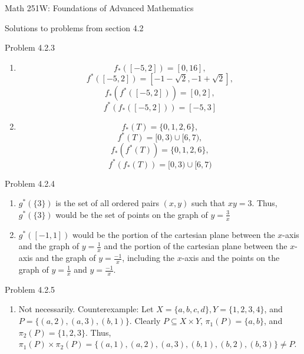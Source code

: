 \documentclass{article}
\theoremstyle{definition}
\begin{document}
	\begin{center}
		\Large{Math 251W: Foundations of Advanced Mathematics}

		\normalsize Solutions to problems from section 4.2 \hline
		\vspace{0.4cm}

	\end{center}


	\noindent Problem 4.2.3  \vspace{0.3cm}

	\begin{enumerate}
		\item[2] $$f_*([-5,2])=[0,16],$$
		$$f^*([-5,2])=[-1-\sqrt{2},-1+\sqrt{2}],$$ $$f_*(f^*([-5,2]))=[0,2],$$
		$$f^*(f_*([-5,2]))=[-5,3]$$
		\item[4] $$f_*(T)=\{0,1,2,6\},$$ $$f^*(T)=[0,3)\cup[6,7),$$
		$$f_*(f^*(T))=\{0,1,2,6\},$$ $$f^*(f_*(T))=[0,3)\cup[6,7)$$
	\end{enumerate}

	\vspace{1cm}


	\noindent Problem 4.2.4  \vspace{0.3cm}

	\begin{enumerate}
		\item $g^*(\{3\})$ is the set of all ordered pairs $(x,y)$ such that
		$xy=3$. Thus, $g^*(\{3\})$ would be the set of points on the graph
		of $y=\frac{3}{x}$
		\item $g^*([-1,1])$ would be the portion of the cartesian plane
		between the $x$-axis and the graph of $y=\frac{1}{x}$ and the
		portion of the cartesian plane between the $x$-axis and the graph of
		$y=\frac{-1}{x}$, including the $x$-axis and the points on the graph
		of $y=\frac{1}{x}$ and $y=\frac{-1}{x}$.
	\end{enumerate}

	\vspace{1cm}


	\noindent Problem 4.2.5  \vspace{0.3cm}

	\begin{enumerate}
		\item[3] Not necessarily. Counterexample: Let $X=\{a,b,c,d\},
		Y=\{1,2,3,4\}$, and $P=\{(a,2), (a,3), (b,1)\}$. Clearly
		$P\subseteq X\times Y$, $\pi_1(P)=\{a,b\}$, and
		$\pi_2(P)=\{1,2,3\}$. Thus,
		$\pi_1(P)\times\pi_2(P)=\{(a,1),(a,2),(a,3),(b,1),(b,2),(b,3)\}\not=P$.
	\end{enumerate}
\end{document}
